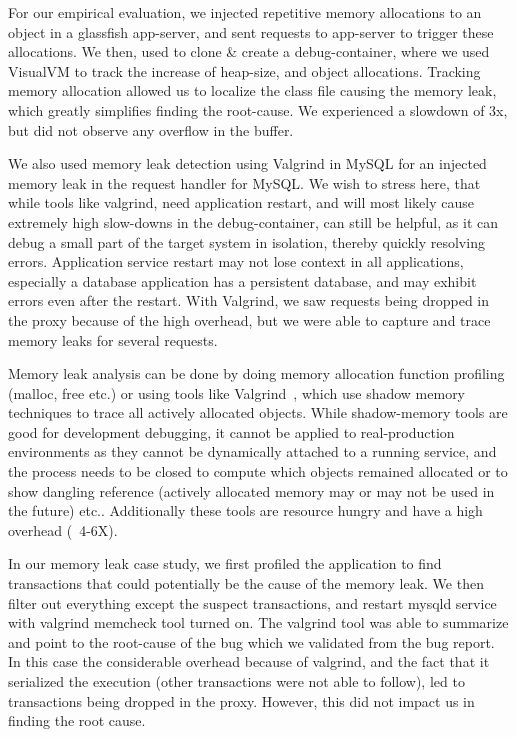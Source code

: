 For our empirical evaluation, we injected repetitive memory allocations to an object in a glassfish app-server, and sent requests to app-server to trigger these allocations.
We then, used \parikshan to clone \& create a debug-container, where we used VisualVM to track the increase of heap-size, and object allocations.
Tracking memory allocation allowed us to localize the class file causing the memory leak, which greatly simplifies finding the root-cause.
We experienced a slowdown of 3x, but did not observe any overflow in the buffer.

We also used memory leak detection using Valgrind in MySQL for an injected memory leak in the request handler for MySQL.
We wish to stress here, that while tools like valgrind, need application restart, and will most likely cause extremely high slow-downs in the debug-container, \parikshan can still be helpful, as it can debug a small part of the target system in isolation, thereby quickly resolving errors.
Application service restart may not lose context in all applications, especially a database application has a persistent database, and may exhibit errors even after the restart.
With Valgrind, we saw requests being dropped in the proxy because of the high overhead, but we were able to capture and trace memory leaks for several requests.


\iffalse
Memory leak analysis can be done by doing memory allocation function profiling (malloc, free etc.) or using tools like Valgrind~\cite{valgrind}, which use shadow memory techniques to trace all actively allocated objects.
While shadow-memory tools are good for development debugging, it cannot be applied to real-production environments as they cannot be dynamically attached to a running service, and the process needs to be closed to compute which objects remained allocated or to show dangling reference (actively allocated memory may or may not be used in the future) etc.. Additionally these tools are resource hungry and have a high overhead (~4-6X).

In our memory leak case study, we first profiled the application to find transactions that could potentially be the cause of the memory leak. 
We then filter out everything except the suspect transactions, and restart mysqld service with valgrind memcheck tool turned on.
The valgrind tool was able to summarize and point to the root-cause of the bug which we validated from the bug report.
In this case the considerable overhead because of valgrind, and the fact that it serialized the execution (other transactions were not able to follow), led to transactions being dropped in the proxy. 
However, this did not impact us in finding the root cause.

